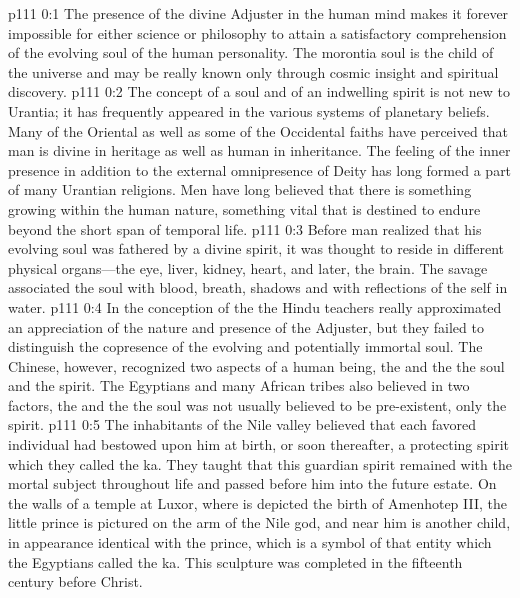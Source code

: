 \author{Solitary Messenger}
\vs p111 0:1 The presence of the divine Adjuster in the human mind makes it forever impossible for either science or philosophy to attain a satisfactory comprehension of the evolving soul of the human personality. The morontia soul is the child of the universe and may be really known only through cosmic insight and spiritual discovery.
\pc \vs p111 0:2 The concept of a soul and of an indwelling spirit is not new to Urantia; it has frequently appeared in the various systems of planetary beliefs. Many of the Oriental as well as some of the Occidental faiths have perceived that man is divine in heritage as well as human in inheritance. The feeling of the inner presence in addition to the external omnipresence of Deity has long formed a part of many Urantian religions. Men have long believed that there is something growing within the human nature, something vital that is destined to endure beyond the short span of temporal life.
\vs p111 0:3 Before man realized that his evolving soul was fathered by a divine spirit, it was thought to reside in different physical organs---the eye, liver, kidney, heart, and later, the brain. The savage associated the soul with blood, breath, shadows and with reflections of the self in water.
\vs p111 0:4 In the conception of the  the Hindu teachers really approximated an appreciation of the nature and presence of the Adjuster, but they failed to distinguish the copresence of the evolving and potentially immortal soul. The Chinese, however, recognized two aspects of a human being, the  and the  the soul and the spirit. The Egyptians and many African tribes also believed in two factors, the  and the  the soul was not usually believed to be pre\hyp{}existent, only the spirit.
\vs p111 0:5 The inhabitants of the Nile valley believed that each favored individual had bestowed upon him at birth, or soon thereafter, a protecting spirit which they called the ka. They taught that this guardian spirit remained with the mortal subject throughout life and passed before him into the future estate. On the walls of a temple at Luxor, where is depicted the birth of Amenhotep III, the little prince is pictured on the arm of the Nile god, and near him is another child, in appearance identical with the prince, which is a symbol of that entity which the Egyptians called the ka. This sculpture was completed in the fifteenth century before Christ.
